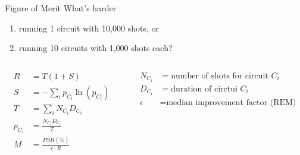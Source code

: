 \documentclass[11pt,aspectratio=1610,xcolor=dvipsnames]{beamer}
\begin{document}
\begin{frame}{Figure of Merit}
	What's harder
	\begin{enumerate}
		\item running 1 circuit with 10,000 shots, or
		\item running 10 circuits with 1,000 shots each?
	\end{enumerate}

	\begin{columns}
		\begin{column}{0.5\textwidth}
			\begin{align*}
				R       & = T(1 + S)                         \\
				S       & = -\sum_{i} p_{C_i} \ln(p_{C_i})   \\
				T       & = \sum_{i}N_{C_i}D_{C_i}           \\
				p_{C_i} & = \frac{N_{C_i}D_{C_i}}{T}         \\
				M       & = \frac{PSR(\%)}{\epsilon \cdot R}
			\end{align*}
		\end{column}
		\begin{column}{0.5\textwidth}
			\begin{align*}
				N_{C_i}  & = \text{number of shots for circuit } C_i \\
				D_{C_i}  & = \text{duration of circtui } C_i         \\
				\epsilon & = \text{median improvement factor (REM)}
			\end{align*}
		\end{column}
	\end{columns}

\end{frame}
\end{document}
